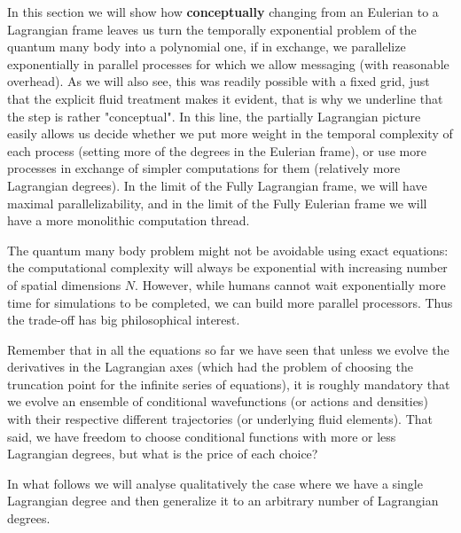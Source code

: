 \documentclass[11pt, a4paper]{article} %
\begin{document}
In this section we will show how {\bf conceptually} changing from an Eulerian to a Lagrangian frame leaves us turn the temporally exponential problem of the quantum many body into a polynomial one, if in exchange, we parallelize exponentially in parallel processes for which we allow messaging (with reasonable overhead). As we will also see, this was readily possible with a fixed grid, just that the explicit fluid treatment makes it evident, that is why we underline that the step is rather "conceptual". In this line, the partially Lagrangian picture easily allows us decide whether we put more weight in the temporal complexity of each process (setting more of the degrees in the Eulerian frame), or use more processes in exchange of simpler computations for them (relatively more Lagrangian degrees). In the limit of the Fully Lagrangian frame, we will have maximal parallelizability, and in the limit of the Fully Eulerian frame we will have a more monolithic computation thread.

The quantum many body problem might not be avoidable using exact equations: the computational complexity will always be exponential with increasing number of spatial dimensions $N$. However, while humans cannot wait exponentially more time for simulations to be completed, we can build more parallel processors. Thus the trade-off has big philosophical interest.

Remember that in all the equations so far we have seen that unless we evolve the derivatives in the Lagrangian axes (which had the problem of choosing the truncation point for the infinite series of equations), it is roughly mandatory that we evolve an ensemble of conditional wavefunctions (or actions and densities) with their respective different trajectories (or underlying fluid elements). That said, we have freedom to choose conditional functions with more or less Lagrangian degrees, but what is the price of each choice?

In what follows we will analyse qualitatively the case where we have a single Lagrangian degree and then generalize it to an arbitrary number of Lagrangian degrees.
\end{document}
